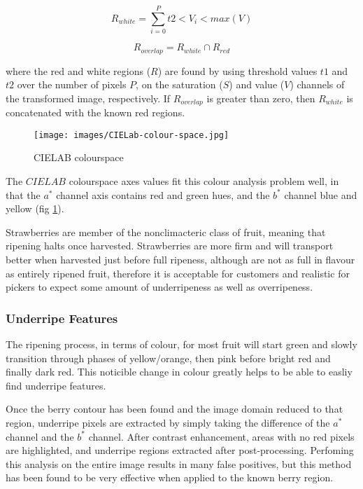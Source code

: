 \documentclass{bmvc2k}
\begin{document}
\begin{equation}
R_{white} = \sum_{i=0}^{P}t2<V_i<max(V)
\label{white_berry_thresh}
\end{equation}

\begin{equation}
R_{overlap} = R_{white} \cap R_{red}
\label{intersect_white_berry}
\end{equation}

where the red and white regions ($R$) are found by using threshold values $t1$ and $t2$ over the number of pixels $P$, on the saturation ($S$) and value ($V$) channels of the transformed image, respectively. If $R_{overlap}$ is greater than zero, then $R_{white}$ is concatenated with the known red regions. 


\begin{figure}[h]
	\centering
	\texttt{[image: images/CIELab-colour-space.jpg]}
	\caption{CIELAB colourspace}
	\label{fig:lab}
\end{figure}


The $CIELAB$ colourspace axes values fit this colour analysis problem well, in that the $a^*$ channel axis contains red and green hues, and the $b^*$ channel blue and yellow (fig \ref{fig:lab}). 

Strawberries are member of the nonclimacteric class of fruit, meaning that ripening halts once harvested. Strawberries are more firm and will transport better when harvested just before full ripeness, although are not as full in flavour as entirely ripened fruit\cite{artur}, therefore it is acceptable for customers and realistic for pickers to expect some amount of underripeness as well as overripeness.

\subsubsection{Underripe Features}

The ripening process, in terms of colour, for most fruit will start green and slowly transition through phases of yellow/orange, then pink before bright red and finally dark red. This noticible change in colour greatly helps to be able to easliy find underripe features.

Once the berry contour has been found and the image domain reduced to that region, underripe pixels are extracted by simply taking the difference of the $a^*$ channel and the $b^*$ channel. After contrast enhancement, areas with no red pixels are highlighted, and underripe regions extracted after post-processing. Perfoming this analysis on the entire image results in many false positives, but this method has been found to be very effective when applied to the known berry region.   
\end{document}
